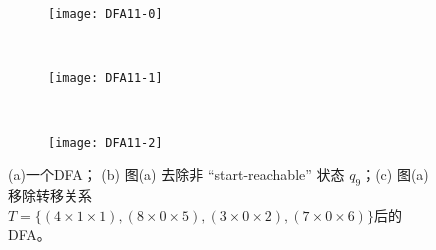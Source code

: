 \begin{figure}[!htbp]
  \centering
  \begin{subfigure}[b]{0.6\textwidth}
      \texttt{[image: DFA11-0]}
      \caption{}
      \label{fig:DFA11-0}
  \end{subfigure}
  \\
  \begin{subfigure}[b]{0.6\textwidth}
      \texttt{[image: DFA11-1]}
      \caption{}
      \label{fig:DFA11-1}
  \end{subfigure}
  \\
  \begin{subfigure}[b]{0.6\textwidth}
      \texttt{[image: DFA11-2]}
      \caption{}
      \label{fig:DFA11-2}
  \end{subfigure}
  \caption{(a)一个DFA；  (b) 图(a) 去除非 “start-reachable” 状态 {$q_9$}；(c) 图(a)移除转移关系$T=\{(4 \times 1 \times 1),(8 \times 0 \times 5),(3 \times 0 \times 2),(7 \times 0 \times 6)\}$后的DFA。 }
  \label{fig:DFA11}
\end{figure}